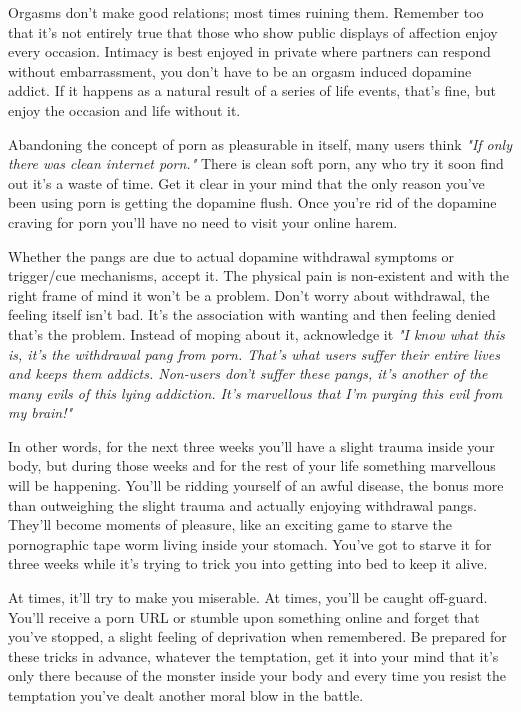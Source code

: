 \documentclass[easypeasy.tex]{subfiles}
\begin{document}
Orgasms don't make good relations; most times ruining them. Remember too that it's not entirely true that those who show public displays of affection enjoy every occasion. Intimacy is best enjoyed in private where partners can respond without embarrassment, you don't have to be an orgasm induced dopamine addict. If it happens as a natural result of a series of life events, that's fine, but enjoy the occasion and life without it.

Abandoning the concept of porn as pleasurable in itself, many users think \textit{"If only there was clean internet porn."} There is clean soft porn, any who try it soon find out it's a waste of time. Get it clear in your mind that the only reason you've been using porn is getting the dopamine flush. Once you're rid of the dopamine craving for porn you'll have no need to visit your online harem.

Whether the pangs are due to actual dopamine withdrawal symptoms or trigger/cue mechanisms, accept it. The physical pain is non-existent and with the right frame of mind it won't be a problem. Don't worry about withdrawal, the feeling itself isn't bad. It's the association with wanting and then feeling denied that's the problem. Instead of moping about it, acknowledge it \textit{"I know what this is, it's the withdrawal pang from porn. That's what users suffer their entire lives and keeps them addicts. Non-users don't suffer these pangs, it's another of the many evils of this lying addiction. It's marvellous that I'm purging this evil from my brain!"}

In other words, for the next three weeks you'll have a slight trauma inside your body, but during those weeks and for the rest of your life something marvellous will be happening. You'll be ridding yourself of an awful disease, the bonus more than outweighing the slight trauma and actually enjoying withdrawal pangs. They'll become moments of pleasure, like an exciting game to starve the pornographic tape worm living inside your stomach. You've got to starve it for three weeks while it's trying to trick you into getting into bed to keep it alive.

At times, it'll try to make you miserable. At times, you'll be caught off-guard. You'll receive a porn URL or stumble upon something online and forget that you've stopped, a slight feeling of deprivation when remembered. Be prepared for these tricks in advance, whatever the temptation, get it into your mind that it's only there because of the monster inside your body and every time you resist the temptation you've dealt another moral blow in the battle.
\end{document}
